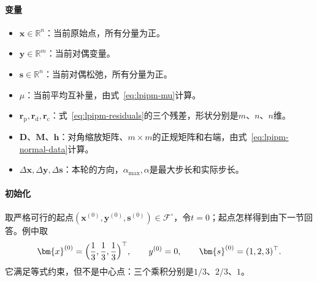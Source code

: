 \paragraph{变量}
\begin{itemize}
 \item $\bm{x}\in\mathbb{R}^n$：当前原始点，所有分量为正。
 \item $\bm{y}\in\mathbb{R}^m$：当前对偶变量。
 \item $\bm{s}\in\mathbb{R}^n$：当前对偶松弛，所有分量为正。
 \item $\mu$：当前平均互补量，由式~\eqref{eq:lpipm-mu}计算。
 \item $\bm{r}_{\mathrm{p}},\bm{r}_{\mathrm{d}},\bm{r}_{\mathrm{c}}$：式~\eqref{eq:lpipm-residuals}的三个残差，形状分别是$m$、$n$、$n$维。
 \item $\bm{D}$、$\bm{M}$、$\bm{h}$：对角缩放矩阵、$m\times m$的正规矩阵和右端，由式~\eqref{eq:lpipm-normal-data}计算。
 \item $\Delta\bm{x},\Delta\bm{y},\Delta\bm{s}$：本轮的方向，$\alpha_{\max},\alpha$是最大步长和实际步长。
\end{itemize}

\paragraph{初始化}
取严格可行的起点$(\bm{x}^{(0)},\bm{y}^{(0)},\bm{s}^{(0)})\in\mathcal{F}^{\circ}$，令$t=0$；起点怎样得到由下一节回答。例中取
\[
 \bm{x}^{(0)}=\Bigl(\frac13,\frac13,\frac13\Bigr)^\top,\qquad y^{(0)}=0,\qquad\bm{s}^{(0)}=(1,2,3)^\top.
\]
它满足等式约束，但不是中心点：三个乘积分别是$1/3$、$2/3$、$1$。

